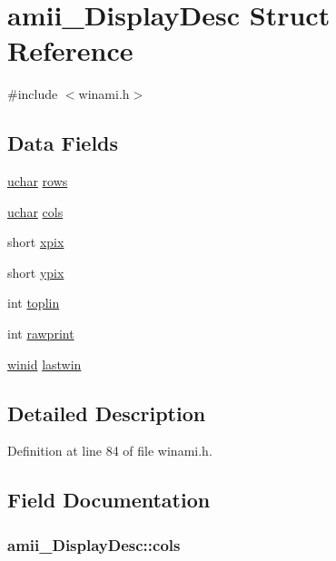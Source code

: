 \hypertarget{structamii__DisplayDesc}{\section{amii\+\_\+\+Display\+Desc Struct Reference}
\label{structamii__DisplayDesc}
}


{\ttfamily \#include $<$winami.\+h$>$}

\subsection*{Data Fields}
\begin{DoxyCompactItemize}
\item 
\hyperlink{config_8h_a65f85814a8290f9797005d3b28e7e5fc}{uchar} \hyperlink{structamii__DisplayDesc_aff6e45d6e31f2217bb6ba101207b74a2}{rows}
\item 
\hyperlink{config_8h_a65f85814a8290f9797005d3b28e7e5fc}{uchar} \hyperlink{structamii__DisplayDesc_a3f8803e91afede713625203f1cb22b80}{cols}
\item 
short \hyperlink{structamii__DisplayDesc_af95f6ae98ff1f0ccc96b06fdd296530e}{xpix}
\item 
short \hyperlink{structamii__DisplayDesc_a24ab4ee31424d8d41235227d2d919b4e}{ypix}
\item 
int \hyperlink{structamii__DisplayDesc_ae1f6917b2fc9ca142cd05d6fb615845d}{toplin}
\item 
int \hyperlink{structamii__DisplayDesc_aaee7b747d7620b0e53252edc0bfc5782}{rawprint}
\item 
\hyperlink{wintype_8h_adc2de956a3f084b1691cf080e1d1412b}{winid} \hyperlink{structamii__DisplayDesc_a7cba815a57de07b72960832e3e454fb2}{lastwin}
\end{DoxyCompactItemize}


\subsection{Detailed Description}


Definition at line 84 of file winami.\+h.



\subsection{Field Documentation}
\hypertarget{structamii__DisplayDesc_a3f8803e91afede713625203f1cb22b80}{
\subsubsection[{cols}]{ amii\+\_\+\+Display\+Desc\+::cols}}\label{structamii__DisplayDesc_a3f8803e91afede713625203f1cb22b80}


